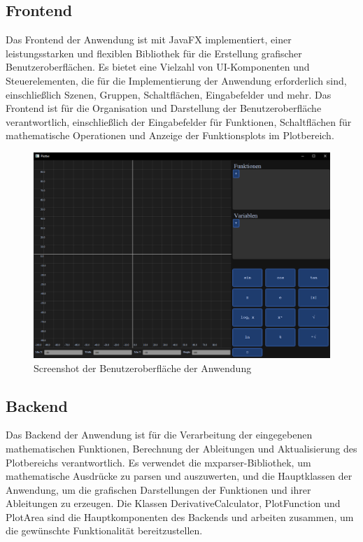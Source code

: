 \documentclass[a4paper]{article}
\begin{document}
\subsection{Frontend}

Das Frontend der Anwendung ist mit JavaFX implementiert, einer leistungsstarken und flexiblen Bibliothek für die Erstellung grafischer Benutzeroberflächen. Es bietet eine Vielzahl von UI-Komponenten und Steuerelementen, die für die Implementierung der Anwendung erforderlich sind, einschließlich Szenen, Gruppen, Schaltflächen, Eingabefelder und mehr. Das Frontend ist für die Organisation und Darstellung der Benutzeroberfläche verantwortlich, einschließlich der Eingabefelder für Funktionen, Schaltflächen für mathematische Operationen und Anzeige der Funktionsplots im Plotbereich.

\begin{figure}[h]
	\centering
	\includegraphics[width=\textwidth]{Resources/gui_screenshot.png}
	\caption{Screenshot der Benutzeroberfläche der Anwendung}
	\label{fig:gui_screenshot}
\end{figure}

\newpage

\subsection{Backend}

Das Backend der Anwendung ist für die Verarbeitung der eingegebenen mathematischen Funktionen, Berechnung der Ableitungen und Aktualisierung des Plotbereichs verantwortlich. Es verwendet die mxparser-Bibliothek, um mathematische Ausdrücke zu parsen und auszuwerten, und die Hauptklassen der Anwendung, um die grafischen Darstellungen der Funktionen und ihrer Ableitungen zu erzeugen. Die Klassen DerivativeCalculator, PlotFunction und PlotArea sind die Hauptkomponenten des Backends und arbeiten zusammen, um die gewünschte Funktionalität bereitzustellen.
\end{document}
